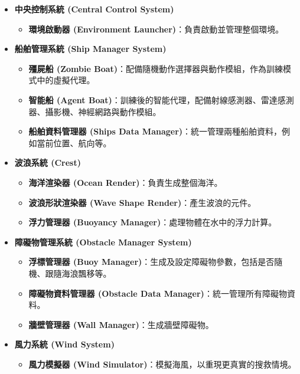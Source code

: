 \documentclass[12pt,a4paper]{ctexart}
\begin{document}
\begin{itemize}
	 \item \textbf{中央控制系統 (Central Control System)}
	\begin{itemize}
	    \item \textbf{環境啟動器 (Environment Launcher)}：負責啟動並管理整個環境。
	\end{itemize}
	
	 \item \textbf{船舶管理系統 (Ship Manager System)}
	\begin{itemize}
	    \item \textbf{殭屍船 (Zombie Boat)}：配備隨機動作選擇器與動作模組，作為訓練模式中的虛擬代理。
	    \item \textbf{智能船 (Agent Boat)}：訓練後的智能代理，配備射線感測器、雷達感測器、攝影機、神經網路與動作模組。
	    \item \textbf{船舶資料管理器 (Ships Data Manager)}：統一管理兩種船舶資料，例如當前位置、航向等。
	\end{itemize}
	
	 \item \textbf{波浪系統 (Crest)}
	\begin{itemize}
	    \item \textbf{海洋渲染器 (Ocean Render)}：負責生成整個海洋。
	    \item \textbf{波浪形狀渲染器 (Wave Shape Render)}：產生波浪的元件。
	    \item \textbf{浮力管理器 (Buoyancy Manager)}：處理物體在水中的浮力計算。
	\end{itemize}
	
	 \item \textbf{障礙物管理系統 (Obstacle Manager System)}
	\begin{itemize}
	    \item \textbf{浮標管理器 (Buoy Manager)}：生成及設定障礙物參數，包括是否隨機、跟隨海浪飄移等。
	    \item \textbf{障礙物資料管理器 (Obstacle Data Manager)}：統一管理所有障礙物資料。
	    \item \textbf{牆壁管理器 (Wall Manager)}：生成牆壁障礙物。
	\end{itemize}
	
	 \item \textbf{風力系統 (Wind System)}
	\begin{itemize}
	    \item \textbf{風力模擬器 (Wind Simulator)}：模擬海風，以重現更真實的搜救情境。
	\end{itemize}
	

\end{itemize}
\end{document}
